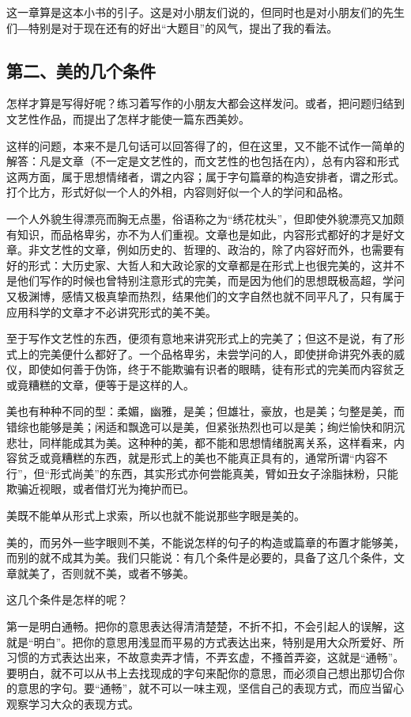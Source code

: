 \documentclass[12pt,a5paper]{ctexbook}
\begin{document}
这一章算是这本小书的引子。这是对小朋友们说的，但同时也是对小朋友们的先生们―特别是对于现在还有的好出“大题目”的风气，提出了我的看法。

\subsection{第二、美的几个条件}
怎样才算是写得好呢？练习着写作的小朋友大都会这样发问。或者，把问题归结到文艺性作品，而提出了怎样才能使一篇东西美妙。

这样的问题，本来不是几句话可以回答得了的，但在这里，又不能不试作一简单的解答：凡是文章（不一定是文艺性的，而文艺性的也包括在内），总有内容和形式这两方面，属于思想情绪者，谓之内容；属于字句篇章的构造安排者，谓之形式。打个比方，形式好似一个人的外相，内容则好似一个人的学问和品格。

一个人外貌生得漂亮而胸无点墨，俗语称之为“绣花枕头”，但即使外貌漂亮又加颇有知识，而品格卑劣，亦不为人们重视。文章也是如此，内容形式都好的才是好文章。非文艺性的文章，例如历史的、哲理的、政治的，除了内容好而外，也需要有好的形式：大历史家、大哲人和大政论家的文章都是在形式上也很完美的，这并不是他们写作的时候也曾特别注意形式的完美，而是因为他们的思想既极高超，学问又极渊博，感情又极真挚而热烈，结果他们的文字自然也就不同平凡了，只有属于应用科学的文章才不必讲究形式的美不美。

至于写作文艺性的东西，便须有意地来讲究形式上的完美了；但这不是说，有了形式上的完美便什么都好了。一个品格卑劣，未尝学问的人，即使拼命讲究外表的威仪，即使如何善于伪饰，终于不能欺骗有识者的眼睛，徒有形式的完美而内容贫乏或竟糟糕的文章，便等于是这样的人。

美也有种种不同的型：柔媚，幽雅，是美；但雄壮，豪放，也是美；匀整是美，而错综也能够是美；闲适和飘逸可以是美，但紧张热烈也可以是美；绚烂愉快和阴沉悲壮，同样能成其为美。这种种的美，都不能和思想情绪脱离关系，这样看来，内容贫乏或竟糟糕的东西，就是形式上的美也不能真正具有的，通常所谓“内容不行”，但“形式尚美”的东西，其实形式亦何尝能真美，臂如丑女子涂脂抹粉，只能欺骗近视眼，或者借灯光为掩护而已。

美既不能单从形式上求索，所以也就不能说那些字眼是美的。

美的，而另外一些字眼则不美，不能说怎样的句子的构造或篇章的布置才能够美，而别的就不成其为美。我们只能说：有几个条件是必要的，具备了这几个条件，文章就美了，否则就不美，或者不够美。

这几个条件是怎样的呢？

第一是明白通畅。把你的意思表达得清清楚楚，不折不扣，不会引起人的误解，这就是“明白”。把你的意思用浅显而平易的方式表达出来，特别是用大众所爱好、所习惯的方式表达出来，不故意卖弄才情，不弄玄虚，不搔首弄姿，这就是“通畅”。要明白，就不可以从书上去找现成的字句来配你的意思，而必须自己想出那切合你的意思的字句。要“通畅”，就不可以一味主观，坚信自己的表现方式，而应当留心观察学习大众的表现方式。
\end{document}
